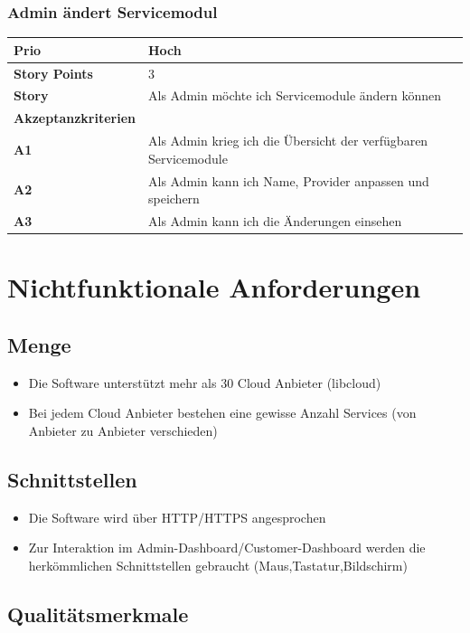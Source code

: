 \documentclass[11pt]{scrartcl}
\begin{document}
   \subsubsection{Admin ändert Servicemodul}
\begin{tabularx}{\linewidth}{l X}
  \textbf{Prio} & Hoch\\
  \hline
  \textbf{Story Points} & 3\\
  \hline
  \textbf{Story}& Als Admin möchte ich Servicemodule ändern können\\
  \hline
    \textbf{Akzeptanzkriterien} & \\
    \hline
  \textbf{A1} & Als Admin krieg ich die Übersicht der verfügbaren Servicemodule\\
  \hline
  \textbf{A2} & Als Admin kann ich Name, Provider anpassen und speichern\\
  \hline
    \textbf{A3} & Als Admin kann ich die Änderungen einsehen\\
  \hline
 \end{tabularx}


\section{Nichtfunktionale Anforderungen}
\subsection{Menge}
\begin{itemize}
  \item Die Software unterstützt mehr als 30 Cloud Anbieter (libcloud)
  \item Bei jedem Cloud Anbieter bestehen eine gewisse Anzahl Services (von Anbieter zu Anbieter verschieden)
\end{itemize}

\subsection{Schnittstellen}
\begin{itemize}
  \item Die Software wird über HTTP/HTTPS angesprochen
  \item Zur Interaktion im Admin-Dashboard/Customer-Dashboard werden die herkömmlichen 
  Schnittstellen gebraucht (Maus,Tastatur,Bildschirm)
\end{itemize}
\subsection{Qualitätsmerkmale}
\end{document}
